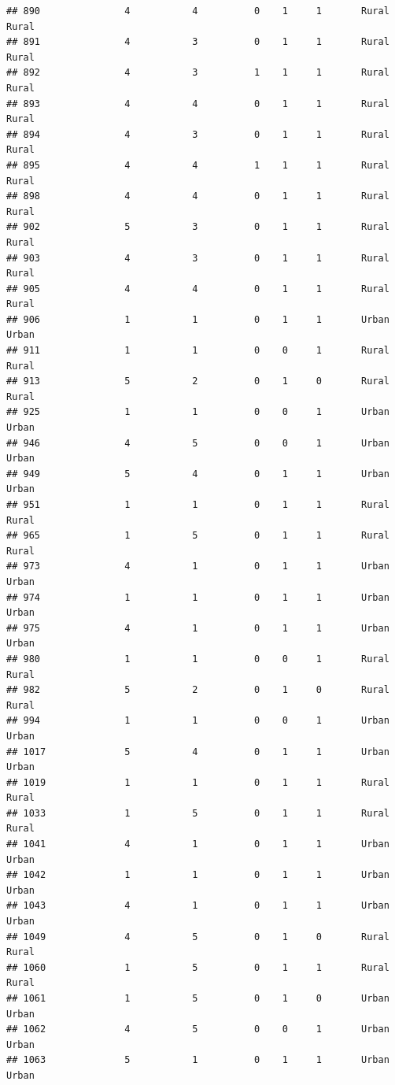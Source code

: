 \documentclass[
]{article}
\begin{document}
\begin{verbatim}
## 890               4           4          0    1     1       Rural Rural
## 891               4           3          0    1     1       Rural Rural
## 892               4           3          1    1     1       Rural Rural
## 893               4           4          0    1     1       Rural Rural
## 894               4           3          0    1     1       Rural Rural
## 895               4           4          1    1     1       Rural Rural
## 898               4           4          0    1     1       Rural Rural
## 902               5           3          0    1     1       Rural Rural
## 903               4           3          0    1     1       Rural Rural
## 905               4           4          0    1     1       Rural Rural
## 906               1           1          0    1     1       Urban Urban
## 911               1           1          0    0     1       Rural Rural
## 913               5           2          0    1     0       Rural Rural
## 925               1           1          0    0     1       Urban Urban
## 946               4           5          0    0     1       Urban Urban
## 949               5           4          0    1     1       Urban Urban
## 951               1           1          0    1     1       Rural Rural
## 965               1           5          0    1     1       Rural Rural
## 973               4           1          0    1     1       Urban Urban
## 974               1           1          0    1     1       Urban Urban
## 975               4           1          0    1     1       Urban Urban
## 980               1           1          0    0     1       Rural Rural
## 982               5           2          0    1     0       Rural Rural
## 994               1           1          0    0     1       Urban Urban
## 1017              5           4          0    1     1       Urban Urban
## 1019              1           1          0    1     1       Rural Rural
## 1033              1           5          0    1     1       Rural Rural
## 1041              4           1          0    1     1       Urban Urban
## 1042              1           1          0    1     1       Urban Urban
## 1043              4           1          0    1     1       Urban Urban
## 1049              4           5          0    1     0       Rural Rural
## 1060              1           5          0    1     1       Rural Rural
## 1061              1           5          0    1     0       Urban Urban
## 1062              4           5          0    0     1       Urban Urban
## 1063              5           1          0    1     1       Urban Urban

\end{verbatim}
\end{document}
